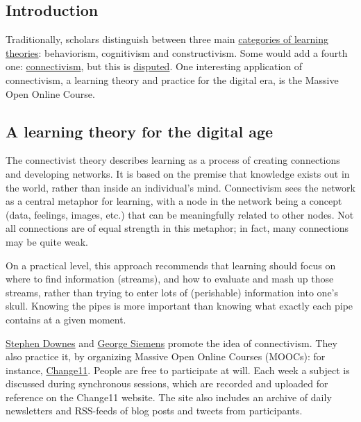 \subsection{Introduction}

Traditionally, scholars distinguish between three main
\href{http://ryan2point0.wordpress.com/2010/01/12/taxonomy-of-learning-theories/}{categories
of learning theories}: behaviorism, cognitivism and constructivism. Some
would add a fourth one:
\href{http://en.wikipedia.org/wiki/Connectivism}{connectivism}, but this
is \href{http://en.wikipedia.org/wiki/Talk:Connectivism}{disputed}. One
interesting application of connectivism, a learning theory and practice
for the digital era, is the Massive Open Online Course.

\subsection{A learning theory for the digital age}

The connectivist theory describes learning as a process of creating
connections and developing networks. It is based on the premise that
knowledge exists out in the world, rather than inside an individual's
mind. Connectivism sees the network as a central metaphor for learning,
with a node in the network being a concept (data, feelings, images,
etc.) that can be meaningfully related to other nodes. Not all
connections are of equal strength in this metaphor; in fact, many
connections may be quite weak.

On a practical level, this approach recommends that learning should
focus on where to find information (streams), and how to evaluate and
mash up those streams, rather than trying to enter lots of (perishable)
information into one's skull. Knowing the pipes is more important than
knowing what exactly each pipe contains at a given moment.

\href{http://en.wikipedia.org/wiki/Stephen\_Downes}{Stephen Downes} and
\href{http://en.wikipedia.org/wiki/George\_Siemens}{George Siemens}
promote the idea of connectivism. They also practice it, by organizing
Massive Open Online Courses (MOOCs): for instance,
\href{http://change.mooc.ca/about.htm}{Change11}. People are free to
participate at will. Each week a subject is discussed during synchronous
sessions, which are recorded and uploaded for reference on the Change11
website. The site also includes an archive of daily newsletters and
RSS-feeds of blog posts and tweets from participants.


